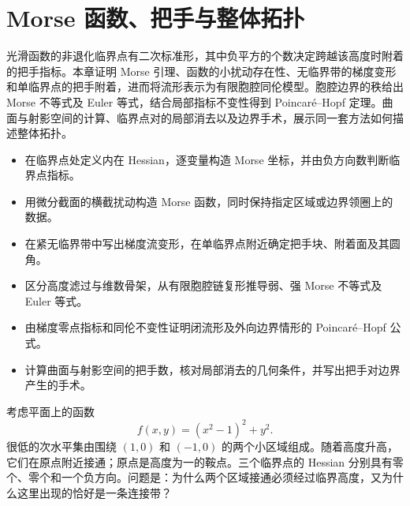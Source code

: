 
% 
% 

\chapter{Morse 函数、把手与整体拓扑}
\label{g2:ch:17}

\begin{chapterabstract}
	光滑函数的非退化临界点有二次标准形，其中负平方的个数决定跨越该高度时附着的把手指标。本章证明 Morse 引理、函数的小扰动存在性、无临界带的梯度变形和单临界点的把手附着，进而将流形表示为有限胞腔同伦模型。胞腔边界的秩给出 Morse 不等式及 Euler 等式，结合局部指标不变性得到 Poincaré--Hopf 定理。曲面与射影空间的计算、临界点对的局部消去以及边界手术，展示同一套方法如何描述整体拓扑。
\end{chapterabstract}

\begin{learninggoals}
	\begin{itemize}
		\item 在临界点处定义内在 Hessian，逐变量构造 Morse 坐标，并由负方向数判断临界点指标。
		\item 用微分截面的横截扰动构造 Morse 函数，同时保持指定区域或边界领圈上的数据。
		\item 在紧无临界带中写出梯度流变形，在单临界点附近确定把手块、附着面及其圆角。
		\item 区分高度滤过与维数骨架，从有限胞腔链复形推导弱、强 Morse 不等式及 Euler 等式。
		\item 由梯度零点指标和同伦不变性证明闭流形及外向边界情形的 Poincaré--Hopf 公式。
		\item 计算曲面与射影空间的把手数，核对局部消去的几何条件，并写出把手对边界产生的手术。
	\end{itemize}
\end{learninggoals}

考虑平面上的函数
\[
	f(x,y)=(x^2-1)^2+y^2.
\]
很低的次水平集由围绕 \((1,0)\) 和 \((-1,0)\) 的两个小区域组成。随着高度升高，它们在原点附近接通；原点是高度为一的鞍点。三个临界点的 Hessian 分别具有零个、零个和一个负方向。问题是：为什么两个区域接通必须经过临界高度，又为什么这里出现的恰好是一条连接带？

